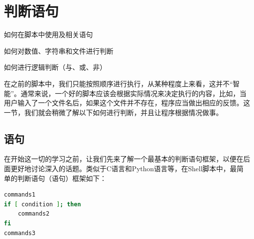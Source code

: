 \section{判断语句}\label{sec:判断语句}

\begin{Abstract}
    \item 如何在脚本中使用及相关语句
    \item 如何对数值、字符串和文件进行判断
    \item 如何进行逻辑判断（与、或、非）
\end{Abstract}

在之前的脚本中，我们只能按照顺序进行执行，从某种程度上来看，这并不“智能”。通常来说，一个好的脚本应该会根据实际情况来决定执行的内容，比如，当用户输入了一个文件名后，如果这个文件并不存在，程序应当做出相应的反馈。这一节，我们就会稍微了解以下如何进行判断，并且让程序根据情况做事。

\subsection{语句}\label{subsec:判断语句-if语句}

在开始这一切的学习之前，让我们先来了解一个最基本的判断语句框架，以便在后面更好地讨论深入的话题。类似于C语言和Python语言等，在Shell脚本中，最简单的判断语句（语句）框架如下：

\begin{lstlisting}[language=bash]
commands1
if [ condition ]; then
    commands2
fi
commands3
\end{lstlisting}

